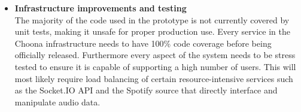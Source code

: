 \begin{itemize}
  \item \textbf{Infrastructure improvements and testing}\\
    The majority of the code used in the prototype is not currently covered by unit tests, making it unsafe for proper production use. Every service in the Choona infrastructure needs to have 100\% code coverage before being officially released. Furthermore every aspect of the system needs to be stress tested to ensure it is capable of supporting a high number of users. This will most likely require load balancing of certain resource-intensive services such as the Socket.IO API and the Spotify source that directly interface and manipulate audio data.
\end{itemize}
